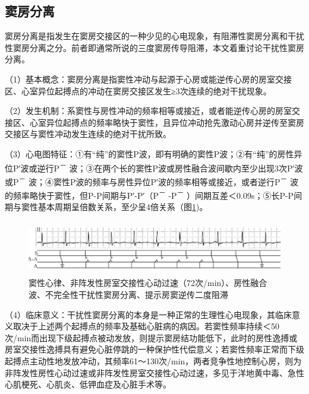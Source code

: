 \protect\hypertarget{text00037.htmlux5cux23subid431}{}{}

\subsection{窦房分离}

窦房分离是指发生在窦房交接区的一种少见的心电现象，有阻滞性窦房分离和干扰性窦房分离之分。前者即通常所说的三度窦房传导阻滞，本文着重讨论干扰性窦房分离。

（1）基本概念：窦房分离是指窦性冲动与起源于心房或能逆传心房的房室交接区、心室异位起搏点的冲动在窦房交接区发生≥3次连续的绝对干扰现象。

（2）发生机制：系窦性与房性冲动的频率相等或接近，或者能逆传心房的房室交接区、心室异位起搏点的频率略快于窦性，且异位冲动抢先激动心房并逆传至窦房交接区与窦性冲动发生连续的绝对干扰所致。

（3）心电图特征：①有“纯”的窦性P波，即有明确的窦性P波；②有“纯”的房性异位P′波或逆行P\textsuperscript{－}
波；③在两个长的窦性P波或房性融合波间歇内至少出现3次P′波或P\textsuperscript{－}
波；④窦性P波的频率与房性异位P′波的频率相等或接近，或者逆行P\textsuperscript{－}
波的频率略快于窦性，但P-P间期与P′-P′（P\textsuperscript{－}
-P\textsuperscript{－}
）间期互差＜0.09s；⑤长P-P间期与窦性基本周期呈倍数关系，至少呈4倍关系（图\ref{fig30-1})。

\begin{figure}[!htbp]
 \centering
 \includegraphics[width=5.78125in,height=0.9375in]{./images/Image00496.jpg}
 \captionsetup{justification=centering}
 \caption{窦性心律、非阵发性房室交接性心动过速（72次/min）、房性融合波、不完全性干扰性窦房分离、提示房窦逆传二度阻滞}
 \label{fig30-1}
  \end{figure} 

（4）临床意义：干扰性窦房分离的本身是一种正常的生理性心电现象，其临床意义取决于上述两个起搏点的频率及基础心脏病的病因。若窦性频率持续＜50次/min而出现下级起搏点被动发放，则提示窦房结功能低下，此时的房性逸搏或房室交接性逸搏具有避免心脏停跳的一种保护性代偿意义；若窦性频率正常而下级起搏点主动性地发放冲动，其频率61～130次/min，两者竞争性地控制心房，则为非阵发性房性心动过速或非阵发性房室交接性心动过速，多见于洋地黄中毒、急性心肌梗死、心肌炎、低钾血症及心脏手术等。

\protect\hypertarget{text00037.htmlux5cux23subid432}{}{}

